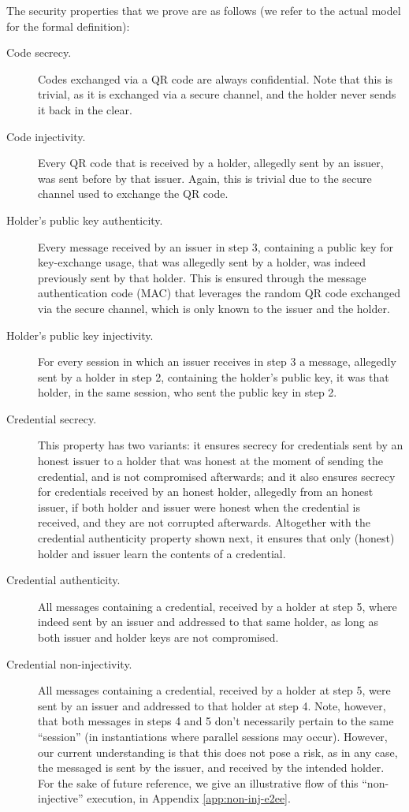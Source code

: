 \documentclass[10pt,a4paper]{article}
\newcommand{\appref}[1]{Appendix \ref{#1}}
\begin{document}
The security properties that we prove are as follows (we refer to the actual
model for the formal definition):

\begin{description}
\item[Code secrecy.] Codes exchanged via a QR code are always confidential.
  Note that this is trivial, as it is exchanged via a secure channel, and
  the holder never sends it back in the clear.
\item[Code injectivity.] Every QR code that is received by a holder, allegedly
  sent by an issuer, was sent before by that issuer. Again, this is trivial due
  to the secure channel used to exchange the QR code.
\item[Holder's public key authenticity.] Every message received by an issuer
  in step 3, containing a public key for key-exchange usage, that was
  allegedly sent by a holder, was indeed previously sent by that holder.
  This is ensured through the message authentication code (MAC) that
  leverages the random QR code exchanged via the secure channel, which is
  only known to the issuer and the holder.
\item[Holder's public key injectivity.] For every session in which an
  issuer receives in step 3 a message, allegedly sent by a holder in
  step 2, containing the holder's public key, it was that holder, in
  the same session, who sent the public key in step 2.  
\item[Credential secrecy.] This property has two variants: it ensures
  secrecy for credentials sent by an honest issuer to a holder that was honest
  at the moment of sending the credential, and is not compromised afterwards;
  and it also ensures secrecy for credentials received by an honest holder,
  allegedly from an honest issuer, if both holder and issuer were honest when
  the credential is received, and they are not corrupted afterwards. Altogether
  with the credential authenticity property shown next, it ensures that only
  (honest) holder and issuer learn the contents of a credential.
\item[Credential authenticity.] All messages containing a credential, received
  by a holder at step 5, where indeed sent by an issuer and addressed to that
  same holder, as long as both issuer and holder keys are not compromised.
\item[Credential non-injectivity.] All messages containing a credential, received
  by a holder at step 5, were sent by an issuer and addressed to that holder
  at step 4. Note, however, that both messages in steps 4 and 5 don't necessarily
  pertain to the  same ``session'' (in instantiations where parallel sessions
  may occur). However, our current understanding is that this does not pose a
  risk, as in any case, the messaged is sent by the issuer, and received by the
  intended holder. For the sake of future reference, we give an illustrative
  flow of this ``non-injective'' execution, in \appref{app:non-inj-e2ee}.
\end{description}
\end{document}
